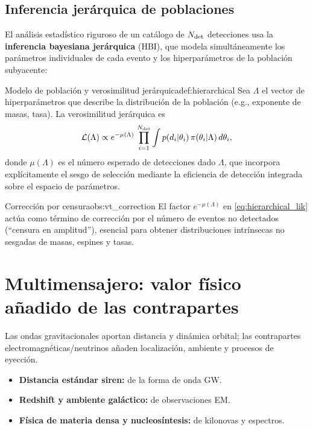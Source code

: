 \subsection{Inferencia jerárquica de poblaciones}

El análisis estadístico riguroso de un catálogo de $N_{\rm det}$ detecciones usa la \textbf{inferencia bayesiana jerárquica} (HBI), que modela simultáneamente los parámetros individuales de cada evento y los hiperparámetros de la población subyacente:

\begin{definicion}{Modelo de población y verosimilitud jerárquica}{def:hierarchical}
Sea $\Lambda$ el vector de hiperparámetros que describe la distribución de la población (e.g., exponente de masas, tasa). La verosimilitud jerárquica es
\begin{equation}
  \mathcal{L}(\Lambda) \propto
  e^{-\mu(\Lambda)}\,
  \prod_{i=1}^{N_{\rm det}}
  \int p(d_i|\theta_i)\,\pi(\theta_i|\Lambda)\,d\theta_i,
  \label{eq:hierarchical_lik}
\end{equation}
donde $\mu(\Lambda)$ es el número esperado de detecciones dado $\Lambda$, que incorpora explícitamente el sesgo de selección mediante la eficiencia de detección integrada sobre el espacio de parámetros.
\end{definicion}

\begin{observacion}{Corrección por censura}{obs:vt_correction}
El factor $e^{-\mu(\Lambda)}$ en \eqref{eq:hierarchical_lik} actúa como término de corrección por el número de eventos no detectados (``censura en amplitud''), esencial para obtener distribuciones intrínsecas no sesgadas de masas, espines y tasas.
\end{observacion}

\section{Multimensajero: valor físico añadido de las contrapartes}
\label{sec:multimensajero}

Las ondas gravitacionales aportan distancia y dinámica orbital; las contrapartes electromagnéticas/neutrinos añaden localización, ambiente y procesos de eyección.

\begin{itemize}[leftmargin=2em]
  \item \textbf{Distancia estándar siren:} de la forma de onda GW.
  \item \textbf{Redshift y ambiente galáctico:} de observaciones EM.
  \item \textbf{Física de materia densa y nucleosíntesis:} de kilonovas y espectros.
\end{itemize}

